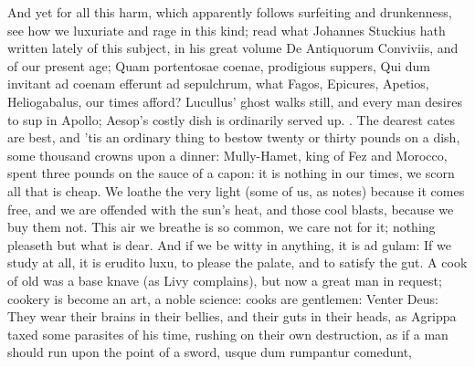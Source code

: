{{And yet for all this harm, which apparently follows surfeiting and
drunkenness, see how we luxuriate and rage in this kind; read what
Johannes Stuckius hath written lately of this subject, in his great
volume De Antiquorum Conviviis, and of our present age; Quam
portentosae coenae, prodigious suppers, Qui dum invitant ad
coenam efferunt ad sepulchrum, what Fagos, Epicures, Apetios,
Heliogabalus, our times afford? Lucullus' ghost walks still, and every
man desires to sup in Apollo; Aesop's costly dish is ordinarily served
up. . The dearest cates are
best, and 'tis an ordinary thing to bestow twenty or thirty pounds on a
dish, some thousand crowns upon a dinner: Mully-Hamet, king of
Fez and Morocco, spent three pounds on the sauce of a capon: it is
nothing in our times, we scorn all that is cheap. We loathe the very
light (some of us, as \Seneca notes) because it comes free, and we
are offended with the sun's heat, and those cool blasts, because we buy
them not. This air we breathe is so common, we care not for it; nothing
pleaseth but what is dear. And if we be witty in anything, it is
ad gulam: If we study at all, it is erudito luxu, to please the palate,
and to satisfy the gut. A cook of old was a base knave (as Livy
complains), but now a great man in request; cookery is become an art, a
noble science: cooks are gentlemen: Venter Deus: They wear their brains
in their bellies, and their guts in their heads, as Agrippa taxed
some parasites of his time, rushing on their own destruction, as if a
man should run upon the point of a sword, usque dum rumpantur comedunt,

}}

